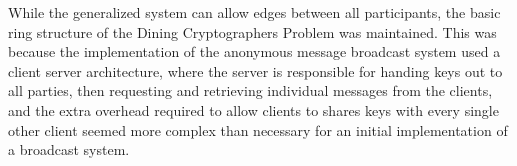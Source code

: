 While the generalized system can allow edges between all participants, the
basic ring structure of the Dining Cryptographers Problem was maintained.
This was because the implementation of the anonymous message broadcast system
used a client server architecture, where the server is responsible for handing
keys out to all parties, then requesting and retrieving individual messages
from the clients, and the extra overhead required to allow clients to shares
keys with every single other client seemed more complex than necessary for an
initial implementation of a broadcast system. \\
